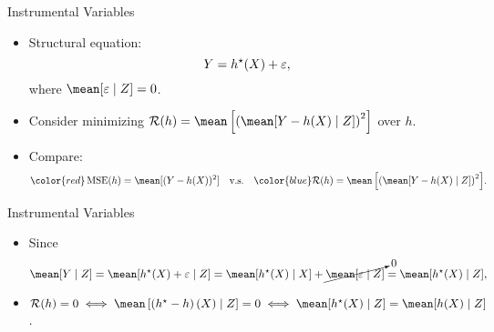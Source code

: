 \documentclass[aspectratio=169]{beamer}
\begin{document}
    \begin{frame}{Instrumental Variables}
       \begin{itemize}
           \item<1->  Structural equation:
               \begin{equation*}
                   Y = h^{ \star } ( X ) + \varepsilon
               ,\end{equation*}
               where $ \mean [ \varepsilon \mid Z ] = 0 $.
           \item<2-> Consider minimizing $ \risk ( h ) = \mean \left[ \left( \mean [ Y - h ( X ) \mid Z ] \right)^2 \right] $ over $ h $.
            \item<3-> Compare:
                \begin{equation*}
                    {\color{red}
                        \mse ( h ) = \mean [ ( Y - h ( X ) )^2 ]
                    }
                    \quad \text{v.s.} \quad
                    {\color{blue}
                        \risk ( h ) = \mean \left[ \left( \mean [ Y - h ( X ) \mid Z ] \right)^2 \right] 
                    }
                .\end{equation*}
       \end{itemize} 
    \end{frame}

    \begin{frame}{Instrumental Variables}
        \begin{itemize}
            \item<1-> Since
                \begin{equation*}
                    \mean [ Y \mid Z ]
                    = \mean [ \hstar ( X ) + \varepsilon \mid Z ]
                    = \mean [ \hstar ( X ) \mid X ] + \cancelto{0}{\mean [ \varepsilon \mid Z ]}
                    = \mean [ \hstar ( X ) \mid Z ]
                ,\end{equation*}
                \item<3-> $ \risk ( h ) = 0 \iff \mean \left[ \left( \hstar - h \right) ( X ) \mid Z \right] = 0 \iff \mean [ \hstar ( X ) \mid Z ] = \mean [ h ( X ) \mid Z ] $.
        \end{itemize}
    \end{frame}
\end{document}
